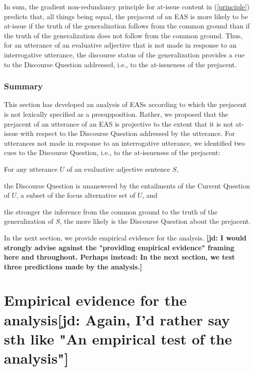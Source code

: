 \documentclass[11pt,fleqn]{article}
\newcommand{\6}{\mbox{$[\hspace*{-.6mm}[$}}
\newcommand{\9}{\mbox{$]\hspace*{-.6mm}]$}}
\newcommand{\jd}[1]{\textbf{\color{green}[jd: #1]}}
\begin{document}
In sum, the gradient non-redundancy principle for at-issue content in (\ref{principle}) predicts that, all things being equal, the prejacent of an EAS is more likely to be at-issue if the truth of the generalization follows from the common ground than if the truth of the generalization does not follow from the common ground. Thus, for an utterance of an evaluative adjective that is not made in response to an interrogative utterance, the discourse status of the generalization provides a cue to the Discourse Question addressed, i.e., to the at-issueness of the prejacent.

\subsubsection{Summary}

This section has developed an analysis of EASs according to which the prejacent is not lexically specified as a presupposition. Rather, we proposed that the prejacent of an utterance of an EAS is projective to the extent that it is not at-issue with respect to the Discourse Question addressed by the utterance. For utterances not made in response to an interrogative utterance, we identified two cues to the Discourse Question, i.e., to the at-issueness of the prejacent:

\begin{exe}
\ex\label{cq-eval} For any utterance $U$ of an evaluative adjective sentence $S$,

\begin{xlist}

\ex the Discourse Question is unanswered by the entailments of the Current Question of $U$, a subset of the focus alternative set of $U$, and

\ex the stronger the inference from the common ground to the truth of the generalization of $S$, the more likely is the Discourse Question about the prejacent.

\end{xlist}

\end{exe}
In the next section, we provide empirical evidence for the analysis. \jd{I would strongly advise against the "providing empirical evidence" framing here and throughout. Perhaps instead: In the next section, we test three predictions made by the analysis.}

\section{Empirical evidence for the analysis\jd{Again, I'd rather say sth like "An empirical test of the analysis"}}\label{s4}
\end{document}
